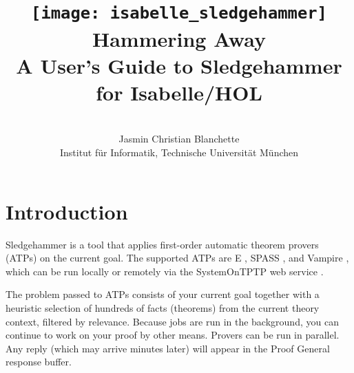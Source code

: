 \documentclass[a4paper,12pt]{article}
\begin{document}

\title{\texttt{[image: isabelle\_sledgehammer]} \\[4ex]
Hammering Away \\[\smallskipamount]
\Large A User's Guide to Sledgehammer for Isabelle/HOL}
\author{\hbox{} \\
Jasmin Christian Blanchette \\
{\normalsize Institut f\"ur Informatik, Technische Universit\"at M\"unchen} \\
\hbox{}}

\maketitle

\tableofcontents

\setlength{\parskip}{.7em plus .2em minus .1em}
\setlength{\parindent}{0pt}
\setlength{\abovedisplayskip}{\parskip}
\setlength{\abovedisplayshortskip}{.9\parskip}
\setlength{\belowdisplayskip}{\parskip}
\setlength{\belowdisplayshortskip}{.9\parskip}

\newenvironment{enum}%
    {\begin{list}{}{%
        \setlength{\topsep}{.1\parskip}%
        \setlength{\partopsep}{.1\parskip}%
        \setlength{\itemsep}{\parskip}%
        \advance\itemsep by-\parsep}}
    {\end{list}}

\def\pre{\begingroup\vskip0pt plus1ex\advance\leftskip by\leftmargin
\advance\rightskip by\leftmargin}
\def\post{\vskip0pt plus1ex\endgroup}

\def\prew{\pre\advance\rightskip by-\leftmargin}
\def\postw{\post}

\section{Introduction}
\label{introduction}

Sledgehammer is a tool that applies first-order automatic theorem provers (ATPs)
on the current goal. The supported ATPs are E \cite{schulz-2002}, SPASS
\cite{weidenbach-et-al-2009}, and Vampire \cite{riazanov-voronkov-2002}, which
can be run locally or remotely via the SystemOnTPTP web service
\cite{sutcliffe-2000}.

The problem passed to ATPs consists of your current goal together with a
heuristic selection of hundreds of facts (theorems) from the current theory
context, filtered by relevance. Because jobs are run in the background, you can
continue to work on your proof by other means. Provers can be run in parallel.
Any reply (which may arrive minutes later) will appear in the Proof General
response buffer.
\end{document}
